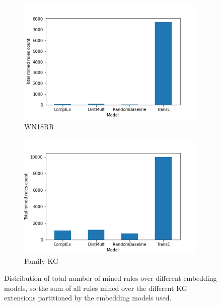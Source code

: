 \begin{figure}[htbp]
\centering
\begin{subfigure}{.5\textwidth}
  \centering
  \includegraphics[width=1\linewidth]{figures/results/Total_mined_rules-model-wn18rr.png}
  \caption{WN18RR}
  \label{total_rules_KG_embedding_dist_WN18RR}
\end{subfigure}%
\begin{subfigure}{.5\textwidth}
  \centering
  \includegraphics[width=1\linewidth]{figures/results/Total_mined_rules-model-family.png}
  \caption{Family KG}
  \label{total_rules_KG_embedding_dist_family}
\end{subfigure}
\caption[Number of total mined rules over embedding models]{Distribution of total number of mined rules over different embedding models, so the sum of all rules mined over the different KG extensions partitioned by the embedding models used.}
\label{total_rules_KG_embedding_dist}
\end{figure}

